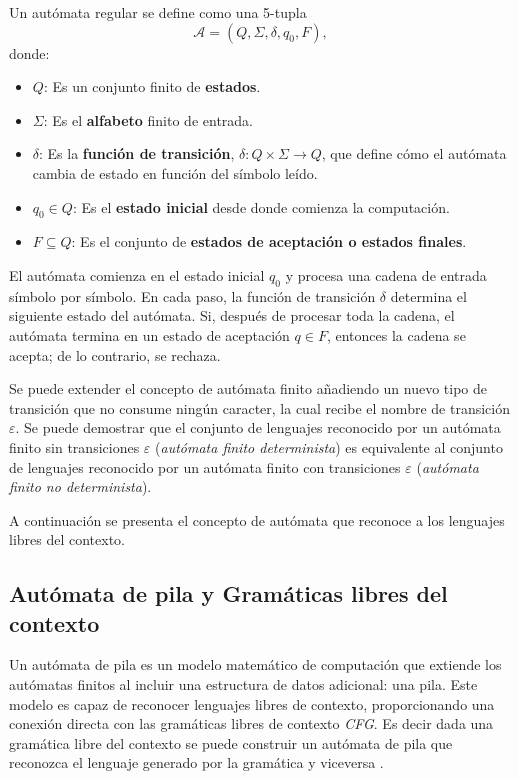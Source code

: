 \documentclass[12pt]{article}
\begin{document}
Un autómata regular se define como una 5-tupla $$\mathcal{A} = (Q, \Sigma, \delta, q_0, F),$$ donde:

\begin{itemize}
      \item $Q$: Es un conjunto finito de \textbf{estados}.
      \item $\Sigma$: Es el \textbf{alfabeto} finito de entrada.
      \item $\delta$: Es la \textbf{función de transición}, $\delta: Q \times \Sigma \to Q$, que define cómo el autómata cambia de estado en función del símbolo leído.
      \item $q_0 \in Q$: Es el \textbf{estado inicial} desde donde comienza la computación.
      \item $F \subseteq Q$: Es el conjunto de \textbf{estados de aceptación o estados finales}.
\end{itemize}

El autómata comienza en el estado inicial $q_0$ y procesa una cadena de entrada símbolo por símbolo.
En cada paso, la función de transición $\delta$ determina el siguiente estado del autómata. Si, después de
procesar toda la cadena, el autómata termina en un estado de aceptación $q \in F$, entonces la cadena
se acepta; de lo contrario, se rechaza.

Se puede extender el concepto de autómata finito añadiendo un nuevo tipo de transición que no consume ningún 
caracter, la cual recibe el nombre de transición $\varepsilon$. Se puede demostrar \cite{authomataTheory} que
el conjunto de lenguajes reconocido por un autómata finito sin transiciones $\varepsilon$
(\textit{autómata finito determinista}) es equivalente al conjunto de lenguajes reconocido por un autómata finito con transiciones $\varepsilon$ (\textit{autómata finito no determinista}).

A continuación se presenta el concepto de autómata que reconoce a los lenguajes libres del contexto.
\subsection{Autómata de pila y Gramáticas libres del contexto}

Un autómata de pila \cite{authomataTheory} es un modelo matemático de computación que extiende los autómatas finitos al incluir una estructura de datos adicional: una pila. Este modelo es capaz de reconocer lenguajes libres de contexto,
proporcionando una conexión directa con las gramáticas libres de contexto \textit{CFG}. 
Es decir dada una gramática libre del contexto se puede construir un autómata de pila que reconozca el lenguaje 
generado por la gramática y viceversa \cite{authomataTheory}.
\end{document}
